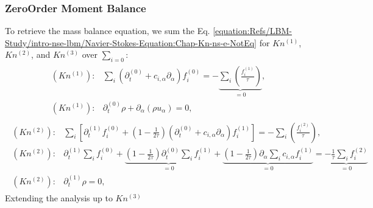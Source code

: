 \documentclass[letterpaper,10pt,english,openany,oneside]{jupyterBook}
\begin{document}
\subsubsection{Zero\sphinxhyphen{}Order Moment Balance}
\label{\detokenize{Refs/LBM-Study/intro-nse-lbm/Navier-Stokes-Equation:zero-order-moment-balance}}
\sphinxAtStartPar
To retrieve the mass balance equation, we sum the Eq. \eqref{equation:Refs/LBM-Study/intro-nse-lbm/Navier-Stokes-Equation:Chap-Kn-ns-e-NotEq} for \(Kn^{(1)}\), \(Kn^{(2)}\), and \(Kn^{(3)}\) over \(\sum_{i=0} \):
\begin{equation}\label{equation:Refs/LBM-Study/intro-nse-lbm/Navier-Stokes-Equation:ns-e-Kn1-B0-all}
\begin{split}
\begin{array}{ll}
(Kn^{(1)}):& \displaystyle\sum_{i}\left( \partial_{t}^{(0)} + c_{i,\alpha}\partial_{\alpha} \right)f_{i}^{(0)}= - \underbrace{\displaystyle\sum_{i}\left(\displaystyle\frac{ f_{i}^{(1)} }{ \tau } \right)}_{=0},\\
(Kn^{(1)}):& \partial_{t}^{(0)}  \rho + \partial_{\alpha} \left( \rho u_{\alpha} \right) =0,
\end{array}
\end{split}
\end{equation}\begin{equation}\label{equation:Refs/LBM-Study/intro-nse-lbm/Navier-Stokes-Equation:ns-e-Kn2-B0-all}
\begin{split}
\begin{array}{ll}
(Kn^{(2)}):& \displaystyle\sum_{i}\left[ \partial_{t}^{(1)} f_{i}^{(0)} + \displaystyle\left(1 - \frac{1}{2\tau}\right)\left( \partial_{t}^{(0)} + c_{i,\alpha}\partial_{\alpha} \right) f_{i}^{(1)}   \right]=  - \displaystyle\sum_{i}\left(\displaystyle\frac{ f_{i}^{(2)} }{ \tau } \right), \nonumber \\
(Kn^{(2)}):& \partial_t^{(1)} \displaystyle\sum_i f_i^{(0)} + \underbrace{\left(1-\frac{1}{2\tau}\right) \partial_t^{(0)} \sum_i f_i^{(1)}}_{=0} + \underbrace{\left(1-\frac{1}{2\tau}\right) \partial_\alpha \sum_i c_{i,\alpha}f_i^{(1)}}_{=0} =\underbrace{-\frac{1}{\tau} \sum_i f_i^{(2)}}_{=0} \\
(Kn^{(2)}):& \partial_{t}^{(1)} \rho = 0,
\end{array}
\end{split}
\end{equation}
\sphinxAtStartPar
Extending the analysis up to \(Kn^{(3)}\)
\end{document}
